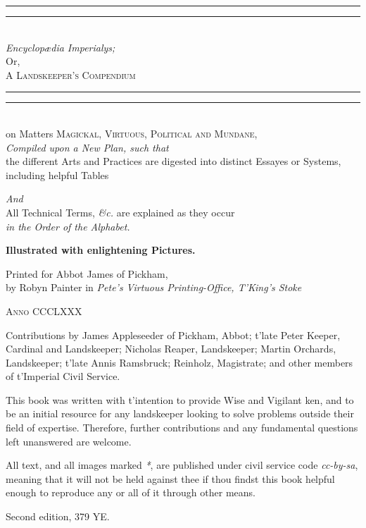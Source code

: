 \documentclass[twoside,11pt,b5paper,twocolumn]{scrbook}
\begin{document}
\begin{titlepage}
 \centering
 \vspace*{\baselineskip}
 \rule{\textwidth}{1.6pt}\vspace*{-\baselineskip}\vspace*{2pt}
 \rule{\textwidth}{0.4pt}\\[\baselineskip]
 
 {\Huge \itshape Encyclopædia Imperialys;}\\[0.4em]
 {\Large Or,\\[0.4em]}
 {\huge\scshape A Landskeeper's Compendium}\\
 \rule{\textwidth}{0.4pt}\vspace*{-\baselineskip}\vspace{3.2pt}
 \rule{\textwidth}{1.6pt}\\[\baselineskip]
 {\Large on Matters \scshape Magickal, Virtuous, Political {\normalfont and} Mundane,\\[1em]}
 {\itshape Compiled upon a New Plan, such that\\[0.5em]}
 {\large the different Arts and Practices are digested into distinct Essayes or Systems, including helpful Tables}
 
 {\itshape And\\[0.5em]}
 {\large All Technical Terms, \textit{\&c.} are explained as they occur \\[0.5em] \itshape in the Order of the Alphabet.}

 \vspace{0.8cm}
 {\bfseries Illustrated with enlightening Pictures.}
 
 \vfill
 
 Printed for Abbot James of Pickham,\\[0.4em]
 by Robyn Painter in {\itshape Pete’s Virtuous Printing-Office, T'King's Stoke}
 
 {\scshape Anno CCCLXXX}
\end{titlepage}
\begin{uppertitleback}{}
Contributions by James Appleseeder of Pickham, Abbot; t'late Peter Keeper, Cardinal and Landskeeper; Nicholas Reaper, Landskeeper; Martin Orchards, Landskeeper; t'late Annis Ramsbruck; Reinholz, Magistrate; and other members of t'Imperial Civil Service.

This book was written with t'intention to provide Wise and Vigilant ken, and to be an initial resource for any landskeeper looking to solve problems outside their field of expertise. Therefore, further contributions and any fundamental questions left unanswered are welcome.

All text, and all images marked \textit{*}, are published under civil service code \textit{cc-by-sa}, meaning that it will not be held against thee if thou findst this book helpful enough to reproduce any or all of it through other means.

Second edition, 379 YE.
\end{uppertitleback}
\setlength{\parindent}{1em}
\end{document}
